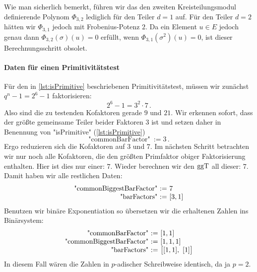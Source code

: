 Wie man sicherlich bemerkt, führen wir das den zweiten Kreisteilungsmodul
definierende Polynom $\Phi_{3,2}$ lediglich für den Teiler $d=1$ auf. Für den
Teiler $d=2$ hätten wir $\Phi_{3,1}$ jedoch mit Frobenius-Potenz $2$. Da ein
Element $u\in E$ jedoch genau dann $\Phi_{3,2}(\sigma)(u) = 0$ erfüllt, wenn 
$\Phi_{3,1}(\sigma^2)(u) = 0$, ist dieser Berechnungsschritt obsolet.

\paragraph{Daten für einen Primitivitätstest}
Für den in \autoref{lst:isPrimitive} beschriebenen Primitivitätstest, müssen
wir zunächst $q^n-1 = 2^6-1$ faktorisieren:
\[ 2^6-1 = 3^2\cdot 7\,.\]
Also sind die zu testenden Kofaktoren gerade $9$ und $21$. Wir erkennen sofort,
dass der größte gemeinsame Teiler beider Faktoren $3$ ist und setzen daher
in Benennung von "isPrimitive" (\autoref{lst:isPrimitive})
\[ \text{"commonBarFactor"}\ := 3\,.\]
Ergo reduzieren sich die Kofaktoren auf $3$ und $7$.
Im nächsten Schritt betrachten wir nur noch alle Kofaktoren, die den größten
Primfaktor obiger Faktorisierung enthalten. Hier ist dies nur einer:
$7$. Wieder berechnen wir den $\operatorname{ggT}$ all dieser: $7$. Damit haben wir alle
restlichen Daten:
\[ \begin{array}{r@{\ :=\ }l}
    \text{"commonBiggestBarFactor"} & 7\\
    \text{"barFactors"} & [3,1]
  \end{array} \]
Benutzen wir binäre Exponentiation so übersetzen wir die erhaltenen Zahlen ins
Binärsystem:
\[ \begin{array}{r@{\ :=\ }l}
    \text{"commonBarFactor"} & [1,1]\\
    \text{"commonBiggestBarFactor"} & [1,1,1]\\
    \text{"barFactors"} & \big[[1,1],\ [1]\big]
  \end{array} \]
In diesem Fall wären die Zahlen in $p$-adischer Schreibweise identisch, da ja
$p=2$.

